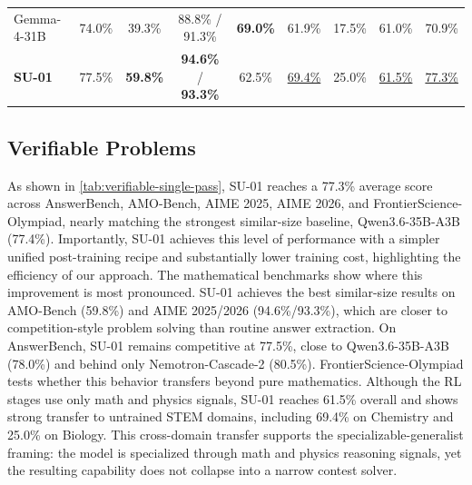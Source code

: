 \begin{table}[t]
{\begin{tabular}{lcccccccc}
Gemma-4-31B & 74.0\% & 39.3\% & 88.8\% / 91.3\% & \textbf{69.0\%} & 61.9\% & 17.5\% & 61.0\% & 70.9\% \\
\rowcolor{ScienceReasoningBg!35}
\textbf{\textcolor{iclrdeepblue}{SU-01}} & 77.5\% & \textbf{59.8\%} & \textbf{94.6\%} / \textbf{93.3\%} & 62.5\% & \underline{69.4\%} & 25.0\% & \underline{61.5\%} & \underline{77.3\%} \\
\bottomrule
\end{tabular}%
}
\end{table}

\subsection{Verifiable Problems}

  As shown in
  \cref{tab:verifiable-single-pass}, SU-01 reaches a 77.3\% average score across
  AnswerBench, AMO-Bench, AIME 2025, AIME 2026, and FrontierScience-Olympiad,
  nearly matching the strongest similar-size baseline, Qwen3.6-35B-A3B (77.4\%).
  Importantly, SU-01 achieves this level of performance with a simpler unified
  post-training recipe and substantially lower training cost, highlighting the
  efficiency of our approach.
The mathematical benchmarks show where this improvement is most pronounced.
SU-01 achieves the best similar-size results on AMO-Bench (59.8\%) and AIME
2025/2026 (94.6\%/93.3\%), which are closer to competition-style problem solving
than routine answer extraction. On AnswerBench, SU-01 remains competitive at
77.5\%, close to Qwen3.6-35B-A3B (78.0\%) and behind only Nemotron-Cascade-2
(80.5\%). 
  FrontierScience-Olympiad tests whether this behavior transfers beyond pure
  mathematics. Although the RL stages use only math and physics signals, SU-01
  reaches 61.5\% overall and shows strong transfer to untrained STEM domains,
  including 69.4\% on Chemistry and 25.0\% on Biology. This cross-domain transfer
  supports the specializable-generalist framing: the model is specialized through
  math and physics reasoning signals, yet the resulting capability does not
  collapse into a narrow contest solver.



